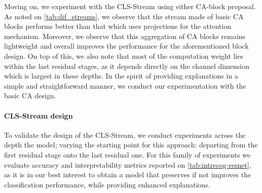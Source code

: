     Moving on, we experiment with the CLS-Stream using either CA-block proposal. As noted on \autoref{tab:dif_streams}, we observe that the stream made of basic CA blocks performs better than that which uses projections for the attention mechanism. Moreover, we observe that this aggregation of CA blocks remains lightweight and overall improves the performance for the aforementioned block design. On top of this, we also note that most of the computation weight lies within the last residual stages, as it depends directly on the channel dimension which is largest in these depths. In the spirit of providing explanations in a simple and straightforward manner, we conduct our experimentation with the basic CA design.


    \paragraph{CLS-Stream design}
    \label{ab:placement}
    To validate the design of the CLS-Stream, we conduct experiments across the depth the model; varying the starting point for this approach: departing from the first residual stage onto the last residual one. For this family of experiments we evaluate accuracy and interpretability metrics reported on \autoref{tab:intrecog-resnet}, as it is in our best interest to obtain a model that preserves if not improves the classification performance, while providing enhanced explanations.

